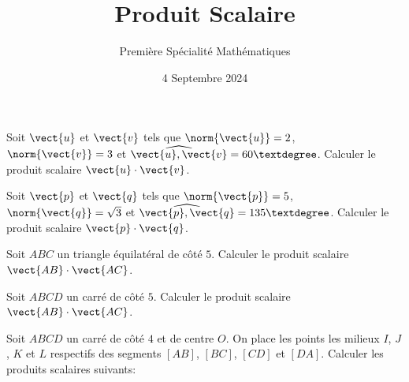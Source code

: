 \documentclass{exam}
\title{Produit Scalaire}
\author{Première Spécialité Mathématiques}
\date{4 Septembre 2024}
\begin{document}
\maketitle
\begin{questions}
\question Soit $\vect{u}$ et $\vect{v}$ tels que $\norm{\vect{u}} = 2$, $\norm{\vect{v}} = 3$ et $\widehat{\vect{u},\vect{v}} = 60°$. Calculer le produit scalaire $\vect{u} \cdot \vect{v}$.
\vspace*{0.5cm}

\question Soit $\vect{p}$ et $\vect{q}$ tels que $\norm{\vect{p}} = 5$, $\norm{\vect{q}} = \sqrt{3}$ et $\widehat{\vect{p},\vect{q}} = 135°$. Calculer le produit scalaire $\vect{p} \cdot \vect{q}$.
\vspace*{0.5cm}

\question Soit $ABC$ un triangle équilatéral de côté $5$. Calculer le produit scalaire $\vect{AB} \cdot \vect{AC}$.
\vspace*{0.5cm}

\question Soit $ABCD$ un carré de côté $5$. Calculer le produit scalaire $\vect{AB} \cdot \vect{AC}$.
\vspace*{0.5cm}

\question Soit $ABCD$ un carré de côté $4$ et de centre $O$. On place les points les milieux $I$, $J$, $K$ et $L$ respectifs des segments $[AB]$, $[BC]$, $[CD]$ et $[DA]$. Calculer les produits scalaires suivants:
\end{questions}
\end{document}
